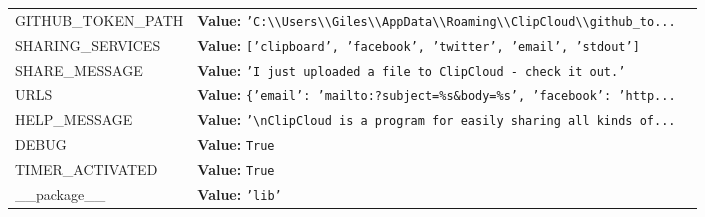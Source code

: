 \begin{longtable}{|p{\varnamewidth}|p{\vardescrwidth}|l}
\cline{1-2}
\raggedright G\-I\-T\-H\-U\-B\-\_\-T\-O\-K\-E\-N\-\_\-P\-A\-T\-H\- & \raggedright \textbf{Value:} 
{\tt \texttt{'}\texttt{C:{\textbackslash}{\textbackslash}Users{\textbackslash}{\textbackslash}Giles{\textbackslash}{\textbackslash}AppData{\textbackslash}{\textbackslash}Roaming{\textbackslash}{\textbackslash}ClipCloud{\textbackslash}{\textbackslash}github\_to}\texttt{...}}&\\
\cline{1-2}
\raggedright S\-H\-A\-R\-I\-N\-G\-\_\-S\-E\-R\-V\-I\-C\-E\-S\- & \raggedright \textbf{Value:} 
{\tt \texttt{[}\texttt{'}\texttt{clipboard}\texttt{'}\texttt{, }\texttt{'}\texttt{facebook}\texttt{'}\texttt{, }\texttt{'}\texttt{twitter}\texttt{'}\texttt{, }\texttt{'}\texttt{email}\texttt{'}\texttt{, }\texttt{'}\texttt{stdout}\texttt{'}\texttt{]}}&\\
\cline{1-2}
\raggedright S\-H\-A\-R\-E\-\_\-M\-E\-S\-S\-A\-G\-E\- & \raggedright \textbf{Value:} 
{\tt \texttt{'}\texttt{I just uploaded a file to ClipCloud - check it out.}\texttt{'}}&\\
\cline{1-2}
\raggedright U\-R\-L\-S\- & \raggedright \textbf{Value:} 
{\tt \texttt{\{}\texttt{'}\texttt{email}\texttt{'}\texttt{: }\texttt{'}\texttt{mailto:?subject=\%s\&body=\%s}\texttt{'}\texttt{, }\texttt{'}\texttt{facebook}\texttt{'}\texttt{: }\texttt{'}\texttt{http}\texttt{...}}&\\
\cline{1-2}
\raggedright H\-E\-L\-P\-\_\-M\-E\-S\-S\-A\-G\-E\- & \raggedright \textbf{Value:} 
{\tt \texttt{'}\texttt{{\textbackslash}nClipCloud is a program for easily sharing all kinds of}\texttt{...}}&\\
\cline{1-2}
\raggedright D\-E\-B\-U\-G\- & \raggedright \textbf{Value:} 
{\tt True}&\\
\cline{1-2}
\raggedright T\-I\-M\-E\-R\-\_\-A\-C\-T\-I\-V\-A\-T\-E\-D\- & \raggedright \textbf{Value:} 
{\tt True}&\\
\cline{1-2}
\raggedright \_\-\_\-p\-a\-c\-k\-a\-g\-e\-\_\-\_\- & \raggedright \textbf{Value:} 
{\tt \texttt{'}\texttt{lib}\texttt{'}}&\\
\cline{1-2}
\end{longtable}

